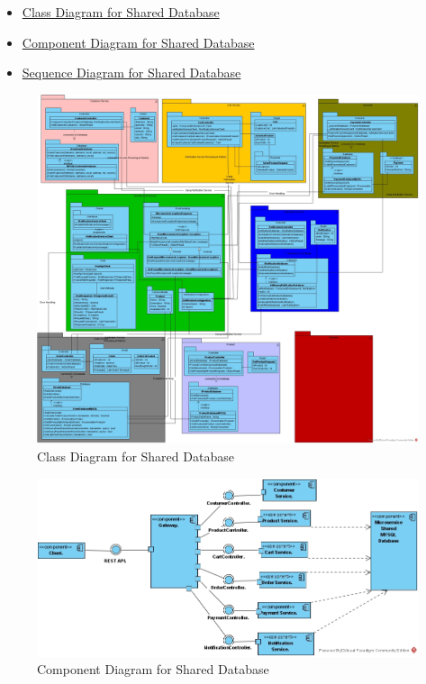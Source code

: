\documentclass{article}
\begin{document}
\begin{itemize}
    \item \href{https://github.com/eylulgokce/Microservices/blob/main/Thesis/UML%20Diagrams/Class%20Diagrams/microservices_class_diagram.jpg}{Class Diagram for Shared Database}
    \item \href{https://github.com/eylulgokce/Microservices/blob/main/Thesis/UML%20Diagrams/Component%20Diagrams/Comp_Shared%20DB.jpg}{Component Diagram for Shared Database}
    \item \href{https://github.com/eylulgokce/Microservices/blob/main/Thesis/UML%20Diagrams/Sequence%20Diagrams/sequence_Shared%20DB.jpg}{Sequence Diagram for Shared Database}
\end{itemize}

\pagebreak

\begin{figure}[h!]
\centering
\includegraphics[scale=0.25, angle=90]{class_DB.jpg}
\caption{Class Diagram for Shared Database}
\label{fig:class_shared}
\end{figure}

\pagebreak

\begin{figure}[h!]
\centering
\includegraphics[scale=0.50, angle=90]{Comp_Shared DB.jpg}
\caption{Component Diagram for Shared Database}
\label{fig:comp_shared}
\end{figure}
\end{document}
